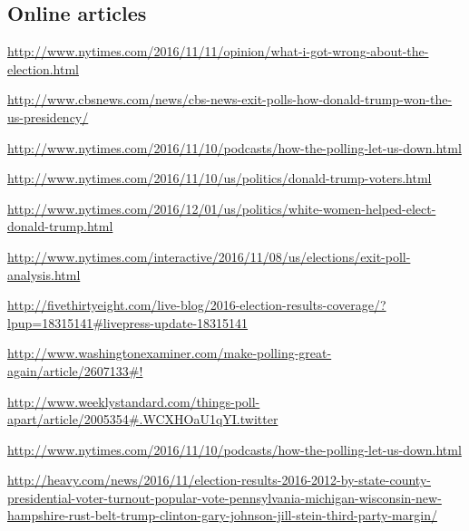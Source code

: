 \documentclass[11pt]{article}
\begin{document}
\subsection{Online articles}
\noindent
\href{http://www.nytimes.com/2016/11/11/opinion/what-i-got-wrong-about-the-election.html}{http://www.nytimes.com/2016/11/11/opinion/what-i-got-wrong-about-the-election.html}

\noindent
\href{http://www.cbsnews.com/news/cbs-news-exit-polls-how-donald-trump-won-the-us-presidency/}{http://www.cbsnews.com/news/cbs-news-exit-polls-how-donald-trump-won-the-us-presidency/}

\noindent
\href{http://www.nytimes.com/2016/11/10/podcasts/how-the-polling-let-us-down.html}{http://www.nytimes.com/2016/11/10/podcasts/how-the-polling-let-us-down.html}

\noindent
\href{http://www.nytimes.com/2016/11/10/us/politics/donald-trump-voters.html}{http://www.nytimes.com/2016/11/10/us/politics/donald-trump-voters.html}

\noindent
\href{http://www.nytimes.com/2016/12/01/us/politics/white-women-helped-elect-donald-trump.html}{http://www.nytimes.com/2016/12/01/us/politics/white-women-helped-elect-donald-trump.html}

\noindent
\href{http://www.nytimes.com/interactive/2016/11/08/us/elections/exit-poll-analysis.html}{http://www.nytimes.com/interactive/2016/11/08/us/elections/exit-poll-analysis.html}

\noindent
\href{http://fivethirtyeight.com/live-blog/2016-election-results-coverage/?lpup=18315141\#livepress-update-18315141}{http://fivethirtyeight.com/live-blog/2016-election-results-coverage/?lpup=18315141\#livepress-update-18315141}

\noindent
\href{http://www.washingtonexaminer.com/make-polling-great-again/article/2607133\#!}{http://www.washingtonexaminer.com/make-polling-great-again/article/2607133\#!}

\noindent
\href{http://www.weeklystandard.com/things-poll-apart/article/2005354\#.WCXHOaU1qYI.twitter}{http://www.weeklystandard.com/things-poll-apart/article/2005354\#.WCXHOaU1qYI.twitter}

\noindent
\href{http://www.nytimes.com/2016/11/10/podcasts/how-the-polling-let-us-down.html}{http://www.nytimes.com/2016/11/10/podcasts/how-the-polling-let-us-down.html}

\noindent
\href{http://heavy.com/news/2016/11/election-results-2016-2012-by-state-county-presidential-voter-turnout-popular-vote-pennsylvania-michigan-wisconsin-new-hampshire-rust-belt-trump-clinton-gary-johnson-jill-stein-third-party-margin/}{http://heavy.com/news/2016/11/election-results-2016-2012-by-state-county-presidential-voter-turnout-popular-vote-pennsylvania-michigan-wisconsin-new-hampshire-rust-belt-trump-clinton-gary-johnson-jill-stein-third-party-margin/}




\end{document}
